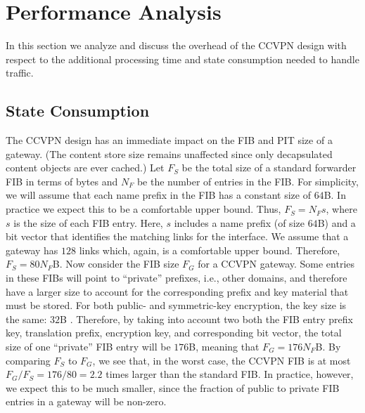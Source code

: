 \section{Performance Analysis}\label{sec:analysis}

In this section we analyze and discuss the overhead of the CCVPN design with respect 
to the additional processing time and state consumption needed to handle traffic. 

\subsection{State Consumption}
The CCVPN design has an immediate impact on the FIB and PIT size of a gateway.
(The content store size remains unaffected since only decapsulated content objects
are ever cached.) Let $F_S$ be the total size of a standard forwarder 
FIB in terms of bytes and
$N_F$ be the number of entries in the FIB. For simplicity, we will assume that
each name prefix in the FIB has a constant size of $64$B. In practice we expect
this to be a comfortable upper bound. Thus, $F_S = N_Fs$, where $s$ is the size of
each FIB entry. Here, $s$ includes a name prefix (of size $64$B) and a bit vector
that identifies the matching links for the interface. We assume that a gateway has
$128$ links which, again, is a comfortable upper bound. Therefore, $F_S = 80N_F$B.
Now consider the FIB size $F_G$ for a CCVPN gateway. Some entries in these FIBs will
point to ``private'' prefixes, i.e., other domains, and therefore have a larger size
to account for the corresponding prefix and key material that must be stored. 
For both public- and symmetric-key encryption, the key size is the same: $32$B \cite{sodium}. 
Therefore, by taking into account two both the FIB entry prefix key, translation
prefix, encryption key, and corresponding bit vector, the total size of one ``private''
FIB entry will be $176$B, meaning that $F_G = 176N_F$B. By comparing $F_S$ to $F_G$, we 
see that, in the worst case, the CCVPN FIB is at most $F_G/F_S = 176/80 = 2.2$ times larger
than the standard FIB. In practice, however, we expect this to be much smaller, since the
fraction of public to private FIB entries in a gateway will be non-zero. 

